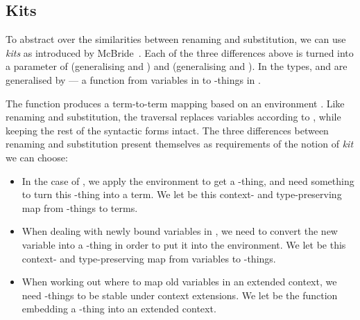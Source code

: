 \bindSub{}
\substitute{}

\subsection{Kits}

To abstract over the similarities between renaming and substitution, we can use
\emph{kits} as introduced by McBride~\cite{McBride05,BHKM12}.
Each of the three differences above is turned into a parameter of
 (generalising  and )
and  (generalising  and
).
In the types,  and  are generalised by
\AgdaSpace{} --- a function from variables in
\AgdaBound{$\Delta$} to -things in \AgdaBound{$\Gamma$}.

\Env{}

The function  produces a term-to-term mapping based on an
environment \AgdaBound{$\rho$}.
Like renaming and substitution, the traversal  replaces
variables according to \AgdaBound{$\rho$}, while keeping the rest of the
syntactic forms intact.
The three differences between renaming and substitution present themselves as
requirements of the notion of \emph{kit} we can choose:

\begin{itemize}
  \item In the  case of , we
        apply the environment \AgdaBound{$\rho$} to get a -thing,
        and need something to turn this -thing into a term.
        We let  be this context- and type-preserving map from
        -things to terms.
  \item When dealing with newly bound variables in , we
        need to convert the new variable into a -thing in order to
        put it into the environment.
        We let  be this context- and type-preserving map from
        variables to -things.
  \item When working out where to map old variables in an extended context, we
        need -things to be stable under context extensions.
        We let  be the function embedding a -thing
        into an extended context.
\end{itemize}

